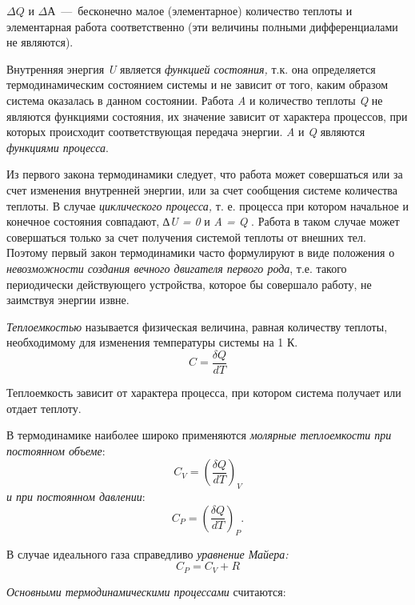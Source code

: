 $\Delta Q$ и $\Delta А$~---~бесконечно малое (элементарное) количество
теплоты и элементарная работа соответственно (эти величины полными
дифференциалами не являются).

Внутренняя энергия \emph{U} является \emph{функцией состояния,} т.к. она
определяется термодинамическим состоянием системы и не зависит от того,
каким образом система оказалась в данном состоянии. Работа \emph{A} и
количество теплоты \emph{Q} не являются функциями состояния, их значение
зависит от характера процессов, при которых происходит соответствующая
передача энергии. \emph{A} и \emph{Q} являются \emph{функциями
процесса}.

Из первого закона термодинамики следует, что работа может совершаться
или за счет изменения внутренней энергии, или за счет сообщения системе
количества теплоты. В случае \emph{циклического процесса,} т. е.
процесса при котором начальное и конечное состояния совпадают, \emph{∆U
= 0} и \emph{A = Q} . Работа в таком случае может совершаться только за
счет получения системой теплоты от внешних тел. Поэтому первый закон
термодинамики часто формулируют в виде положения о \emph{невозможности
создания вечного двигателя первого рода}, т.е. такого периодически
действующего устройства, которое бы совершало работу, не заимствуя
энергии извне.

\emph{Теплоемкостью} называется физическая величина, равная количеству
теплоты, необходимому для изменения температуры системы на 1 К.
\begin{equation}
  C = \frac{\delta Q}{dT}
\end{equation}

Теплоемкость зависит от характера процесса, при котором система получает
или отдает теплоту.

В термодинамике наиболее широко применяются \emph{молярные теплоемкости
при постоянном объеме}: 
\begin{equation}
  C_V = \left (\frac{\delta Q}{dT} \right )_V
\end{equation}
\emph{и при постоянном давлении}: 
\begin{equation}
  C_P = \left (\frac{\delta Q}{dT} \right )_P.
\end{equation}

В случае идеального газа справедливо \emph{уравнение Майера:}
\begin{equation}
  C_P = C_V + R
\end{equation}

\emph{Основными термодинамическими процессами} считаются:

